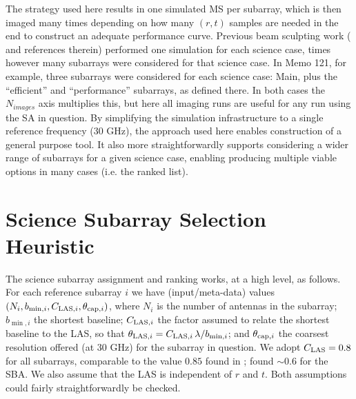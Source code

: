 \documentclass[11pt]{article}
\begin{document}
The strategy used here results in one simulated MS per subarray, which
is then imaged many times depending on how many $(r,t)$ samples are
needed in the end to construct an adequate performance curve. Previous
beam sculpting work (\cite{memo121} and references therein) performed
one simulation for each science case, times however many subarrays
were considered for that science case.  In Memo 121, for example,
three subarrays were considered for each science case: Main, plus the
``efficient'' and ``performance'' subarrays, as defined there. In both
cases the $N_{images}$ axis multiplies this, but here all imaging runs
are useful for any run using the SA in question.  By simplifying the
simulation infrastructure to a single reference frequency (30 GHz),
the approach used here enables construction of a general purpose
tool. It also more straightforwardly supports considering a wider
range of subarrays for a given science case, enabling producing
multiple viable options in many cases (i.e. the ranked list).


\section{Science Subarray Selection Heuristic}
\label{sec:heuristic}

The science subarray assignment and ranking works, at a high level, as
follows.  For each reference subarray $i$ we have (input/meta-data)
values $(N_i, b_{\min,i}, C_{{\rm LAS},i}, \theta_{{\rm cap},i})$,
where $N_i$ is the number of antennas in the subarray; $b_{\min,i}$
the shortest baseline; $C_{{\rm LAS},i}$ the factor assumed to relate
the shortest baseline to the LAS, so that $\theta_{{\rm LAS},i} =
C_{{\rm LAS},i}\,\lambda/b_{\min,i}$; and $\theta_{{\rm cap},i}$ the
coarsest resolution offered (at 30 GHz) for the subarray in question.
We adopt $C_{\rm LAS}=0.8$ for all subarrays, comparable to the value
$0.85$ found in \citep{memo67}; \citep{memo67} found $\sim 0.6$ for
the SBA.  We also assume that the LAS is independent of $r$ and $t$.
Both assumptions could fairly straightforwardly be checked.
\end{document}

